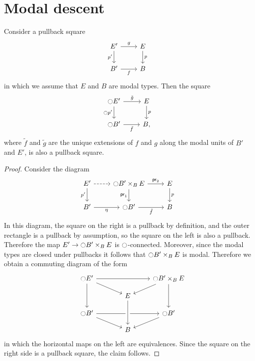 \documentclass[9pt,twosided]{amsart}
\begin{document}
\section{Modal descent}

\begin{prp}\label{thm:etale_flattening}
Consider a pullback square
\begin{equation*}
\begin{tikzcd}
E' \arrow[d,swap,"{p'}"] \arrow[r,"g"] & E \arrow[d,"p"] \\
B' \arrow[r,swap,"f"] & B
\end{tikzcd}
\end{equation*}
in which we assume that $E$ and $B$ are modal types. Then the square
  \begin{equation*}
    \begin{tikzcd}
      \modal E' \arrow[r,"\tilde{g}"] \arrow[d,swap,"{\modal p'}"] & E \arrow[d,"p"] \\
      \modal B' \arrow[r,swap,"\tilde{f}"] & B,
    \end{tikzcd}
  \end{equation*}
  where $\tilde{f}$ and $\tilde{g}$ are the unique extensions of $f$ and $g$ along the modal units of $B'$ and $E'$, is also a pullback square.
\end{prp}

\begin{proof}
Consider the diagram
\begin{equation*}
\begin{tikzcd}
E' \arrow[r,dashed] \arrow[d,swap,"{p'}"] & \modal B'\times_{B} E \arrow[r,"\proj 2"] \arrow[d,swap,"\proj 1"] & E \arrow[d,"p"] \\
B' \arrow[r,swap,"\modalunit"] & \modal B' \arrow[r,swap,"\tilde{f}"] & B
\end{tikzcd}
\end{equation*}
In this diagram, the square on the right is a pullback by definition, and the outer rectangle is a pullback by assumption, so the square on the left is also a pullback. Therefore the map $E'\to {\ensuremath{\ocircle}} B'\times_B E$ is ${\ocircle}$-connected. Moreover, since the modal types are closed under pullbacks it follows that ${\ocircle} B'\times_B E$ is modal. Therefore we obtain a commuting diagram of the form
\begin{equation*}
  \begin{tikzcd}[row sep=small]
    \modal E' \arrow[dd] \arrow[rr] \arrow[dr] & & \modal B'\times_B E \arrow[dd] \arrow[dl] \\
    \phantom{\modal B'\times_B E} & E \\
    \modal B' \arrow[rr] \arrow[dr] & & \modal B' \arrow[dl] \\
    & B \arrow[from=uu,crossing over]
  \end{tikzcd}
\end{equation*}
in which the horizontal maps on the left are equivalences. Since the square on the right side is a pullback square, the claim follows.
\end{proof}
\end{document}
